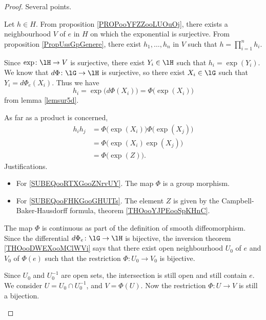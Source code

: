 \begin{theorem}
\begin{proof}
	Several points.
	\begin{subproof}
		Let \( h\in H\). From proposition \ref{PROPooYFZZooLUOuOj}, there exists a neighbourhood \( V\) of \( e\) in \( H\) on which the exponential is surjective. From proposition \ref{PropUssGpGenere}, there exist \( h_1,\ldots, h_n\) in \( V\) such that \( h=\prod_{i=1}^nh_i\).

		Since \( \exp\colon \lH\to V\) is surjective, there exist \( Y_i\in \lH\) such that \( h_i=\exp(Y_i)\). We know that \( d\Phi\colon \lG\to \lH\) is surjective, so there exist \( X_i\in\lG\) such that \( Y_i=d\Phi_e(X_i)\). Thus we have
		\begin{equation}
			h_i=\exp\big( d\Phi(X_i) \big)=\Phi\big( \exp(X_i) \big)
		\end{equation}
		from lemma \ref{lemsur5d}.

		As far as a product is concerned,
		\begin{subequations}
			\begin{align}
				h_ih_j & =\Phi\big( \exp(X_i) \big)\Phi\big( \exp(X_j) \big)                \\
				       & =\Phi\big( \exp(X_i)\exp(X_j) \big)    \label{SUBEQooRTXGooZNrvUY} \\
				       & =\Phi\big( \exp(Z) \big).      \label{SUBEQooFHKGooGHUITs}
			\end{align}
		\end{subequations}
		Justifications.
		\begin{itemize}
			\item For \eqref{SUBEQooRTXGooZNrvUY}. The map \( \Phi\) is a group morphism.
			\item For \eqref{SUBEQooFHKGooGHUITs}. The element \( Z\) is given by the Campbell-Baker-Hausdorff formula, theorem \ref{THOooYJPEooSpKHnC}.
		\end{itemize}
		\spitem[Continuous]
		The map \( \Phi\) is continuous as part of the definition of smooth diffeomorphism.
		Since the differential \( d\Phi_e\colon \lG\to \lH\) is bijective, the inversion theorem \ref{THOooDWEXooMClWVi} says that there exist open neighbourhood \( U_0\) of \( e\) and \( V_0\) of \( \Phi(e)\) such that  the restriction \( \Phi\colon U_0\to V_0\) is bijective.

		Since \( U_0\) and \( U_0^{-1}\) are open sets, the intersection is still open and still contain \( e\). We consider \( U=U_0\cap U_0^{-1}\), and \( V=\Phi(U)\). Now the restriction \( \Phi\colon U\to V\) is still a bijection.


\end{subproof}
\end{proof}
\end{theorem}
